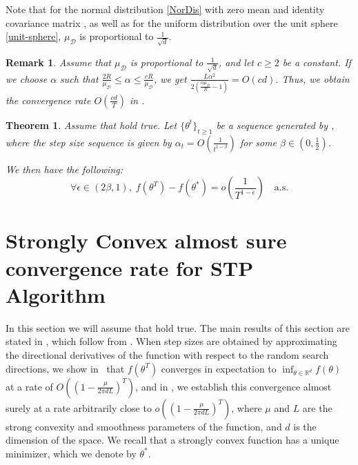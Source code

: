 \documentclass{article} %
\newtheorem{theorem}{Theorem}
\newtheorem{Remark}{Remark}
\begin{document}
Note that for the normal distribution \ref{NorDis} with zero mean and identity covariance matrix , as well as for the uniform distribution over the unit sphere \ref{unit-sphere}, $\mu_{\mathcal{D}}$ is proportional to $\frac{1}{\sqrt{d}}$.

\begin{Remark}\label{LimitR}
Assume that $\mu_{\mathcal{D}}$ is proportional to $\frac{1}{\sqrt{d}}$, and 
let $c\geq 2$ be a constant. If we choose $\alpha$ such that $\frac{2R}{\mu_{\mathcal{D}}}\le \alpha \le \frac{cR}{\mu_{\mathcal{D}}}$, we get $\frac{ L \alpha^2  }{ 2(\frac{\alpha \mu_{\mathcal{D}}  }{R} -1)} = O(c d)$. Thus, we obtain the convergence rate  $O(\frac{c d}{T})$ in .
\end{Remark}


\begin{theorem}\label{Thm5}
Assume that  hold true.  Let \( \{\theta^t\}_{t \geq 1} \) be a sequence generated by , where the step size sequence is given by \( \alpha_t = O\left( \frac{1}{t^{1 - \beta}} \right) \) for some \( \beta \in \left( 0, \frac{1}{2} \right) \).

We then have the following:
\[
\forall \epsilon \in (2\beta, 1), \; f(\theta^T) - f(\theta^{*}) = o\left( \frac{1}{T^{1 - \epsilon}} \right) \quad \text{a.s.}
\]

\end{theorem}




\section{Strongly Convex almost sure convergence rate for STP Algorithm}\label{sec5}
In this section we will assume that   hold true. 
The main results of this section are stated in , which follow from .  When step sizes are obtained
by approximating the directional derivatives of the function with respect to the random search directions, 
we show in~ that $f(\theta^T)$ converges in expectation to $\inf_{\theta \in \mathbb{R}^d} f(\theta)$ at a rate of $O((1-\frac{\mu}{2\pi dL})^T)$, 
and in , we establish this convergence almost surely 
at a rate arbitrarily close to $o((1-\frac{\mu}{2\pi dL})^T)$, 
where $\mu$ and $L$
are  the strong convexity and smoothness parameters of the function, and $d$ is the dimension of the space. 
We recall that a strongly convex function has a unique minimizer, which we denote by $\theta^{*}$.%
\end{document}
